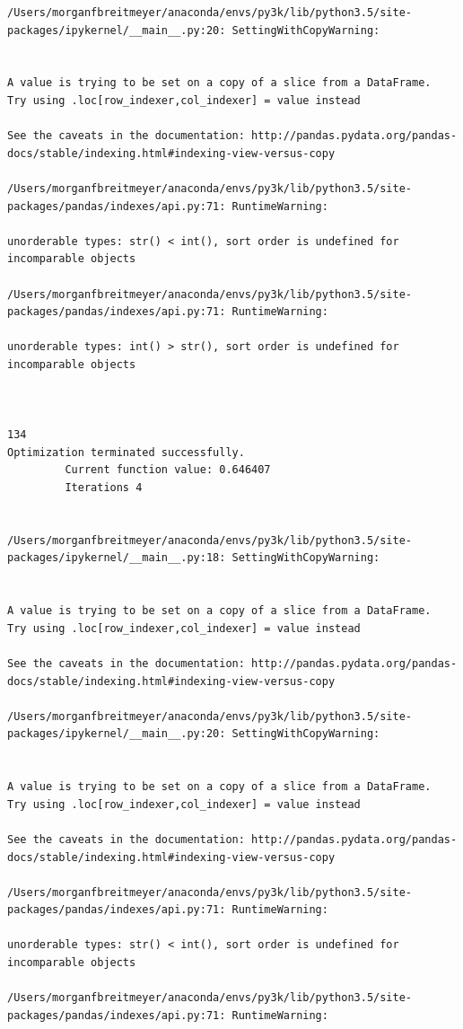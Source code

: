 \begin{lstlisting}
/Users/morganfbreitmeyer/anaconda/envs/py3k/lib/python3.5/site-packages/ipykernel/__main__.py:20: SettingWithCopyWarning:


A value is trying to be set on a copy of a slice from a DataFrame.
Try using .loc[row_indexer,col_indexer] = value instead

See the caveats in the documentation: http://pandas.pydata.org/pandas-docs/stable/indexing.html#indexing-view-versus-copy

/Users/morganfbreitmeyer/anaconda/envs/py3k/lib/python3.5/site-packages/pandas/indexes/api.py:71: RuntimeWarning:

unorderable types: str() < int(), sort order is undefined for incomparable objects

/Users/morganfbreitmeyer/anaconda/envs/py3k/lib/python3.5/site-packages/pandas/indexes/api.py:71: RuntimeWarning:

unorderable types: int() > str(), sort order is undefined for incomparable objects



134
Optimization terminated successfully.
         Current function value: 0.646407
         Iterations 4


/Users/morganfbreitmeyer/anaconda/envs/py3k/lib/python3.5/site-packages/ipykernel/__main__.py:18: SettingWithCopyWarning:


A value is trying to be set on a copy of a slice from a DataFrame.
Try using .loc[row_indexer,col_indexer] = value instead

See the caveats in the documentation: http://pandas.pydata.org/pandas-docs/stable/indexing.html#indexing-view-versus-copy

/Users/morganfbreitmeyer/anaconda/envs/py3k/lib/python3.5/site-packages/ipykernel/__main__.py:20: SettingWithCopyWarning:


A value is trying to be set on a copy of a slice from a DataFrame.
Try using .loc[row_indexer,col_indexer] = value instead

See the caveats in the documentation: http://pandas.pydata.org/pandas-docs/stable/indexing.html#indexing-view-versus-copy

/Users/morganfbreitmeyer/anaconda/envs/py3k/lib/python3.5/site-packages/pandas/indexes/api.py:71: RuntimeWarning:

unorderable types: str() < int(), sort order is undefined for incomparable objects

/Users/morganfbreitmeyer/anaconda/envs/py3k/lib/python3.5/site-packages/pandas/indexes/api.py:71: RuntimeWarning:


\end{lstlisting}
